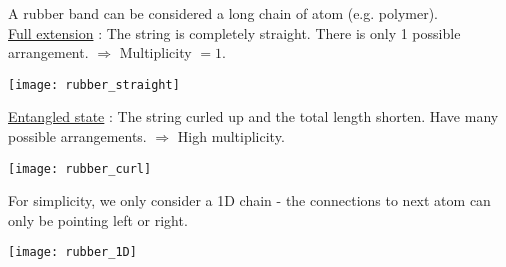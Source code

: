 \documentclass[class=article, crop=false, 12pt]{standalone}
\begin{document}
A rubber band can be considered a long chain of atom (e.g. polymer).\\

\ul{Full extension} : The string is completely straight.
There is only 1 possible arrangement. 
$\Rightarrow$ Multiplicity $=1$.

\begin{center}
    \begin{minipage}{0.55\linewidth}
        \centering
        \texttt{[image: rubber\_straight]}
    \end{minipage}
\end{center}


\ul{Entangled state} : The string curled up and the total length shorten.
Have many possible arrangements.
$\Rightarrow$ High multiplicity.

\begin{center}
    \begin{minipage}{0.4\linewidth}
        \centering
        \texttt{[image: rubber\_curl]}
    \end{minipage}
\end{center}

For simplicity, we only consider a 1D chain - 
the connections to next atom can only be pointing left or right.

\begin{center}
    \begin{minipage}{0.6\linewidth}
        \centering
        \texttt{[image: rubber\_1D]}
    \end{minipage}
\end{center}
\end{document}
